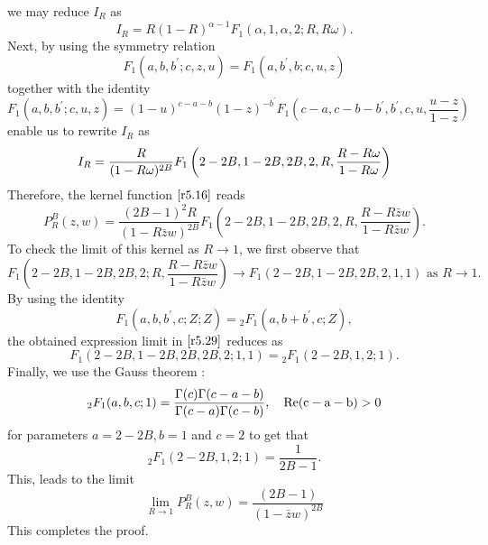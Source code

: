 we may reduce $I_{R}$ as 
\begin{equation}
\label{r5.24}
I_{R}=R(1-R)^{\alpha -1}F_{1}\left( \alpha ,1,\alpha ,2;R,R\omega \right) . 
\end{equation}
Next, by using the symmetry relation 
\begin{equation}
\label{r5.25}
F_{1}\left( a,b,b^{\prime };c,z,u\right) =F_{1}\left( a,b^{\prime
},b;c,u,z\right)  
\end{equation}
together with the identity \cite[p.449]{PBM}
\begin{equation}
\label{r5.26}
F_{1}\left( a,b,b^{\prime };c,u,z\right) =(1-u)^{c-a-b}(1-z)^{-b^{\prime
}}F_{1}\left( c-a,c-b-b^{\prime },b^{\prime },c,u,\frac{u-z}{1-z}\right) 
\end{equation}
enable us to rewrite $I_{R}$ as 
\begin{equation}
\label{r5.27}
I_{R}=\frac{R}{(1-R\omega )^{2B}}F_{1}\left( 2-2B,1-2B,2B,2,R,\frac{%
R-R\omega }{1-R\omega }\right)  
\end{equation}
Therefore, the kernel function $\eqref{r5.16} $ reads 
\begin{equation}
\label{r5.28}
P_{R}^{B}(z,w)=\frac{(2B-1)^{2}R}{(1-R\bar{z}w)^{2B}}F_{1}\left(
2-2B,1-2B,2B,2,R,\frac{R-R\bar{z}w}{1-R\bar{z}w}\right) . 
\end{equation}
To check the limit of this kernel as $R\rightarrow 1$, we first observe that 
\begin{equation}
\label{r5.29}
F_{1}\left( 2-2B,1-2B,2B,2;R,\frac{R-R\bar{z}w}{1-R\bar{z}w}\right)
\rightarrow F_{1}\left( 2-2B,1-2B,2B,2,1,1\right) \text{ as \ }R\rightarrow
1.  
\end{equation}
By using the identity \cite[p.452]{PBM} 
\begin{equation}
\label{r5.30}
F_{1}\left( a,b,b^{\prime },c;Z;Z\right) ={}_{2}F_{1}\left( a,b+b^{\prime
},c;Z\right) ,  
\end{equation}
the obtained expression limit in $\eqref{r5.29}$ reduces as 
\begin{equation}
\label{r5.31}
F_{1}\left( 2-2B,1-2B,2B,2B,2;1,1\right) ={}_{2}F_{1}\left(
2-2B,1,2;1\right) .  
\end{equation}
Finally, we use the Gauss theorem \cite[p.489]{PBM}: 
\begin{equation}
\label{r5.32}
{}_{2}F_{1}(a,b,c;1)=\frac{\Gamma (c)\Gamma (c-a-b)}{\Gamma (c-a)\Gamma (c-b)%
}, \quad \rm{Re}(c-a-b)>0  
\end{equation}
for parameters $a=2-2B,b=1$ and $c=2$ to get that 
\begin{equation}
\label{r5.33}
{}_{2}F_{1}\left( 2-2B,1,2;1\right) =\frac{1}{2B-1}.  
\end{equation}
This, leads to the limit 
\begin{equation}
\label{r5.34}
\lim_{R\rightarrow 1}P_{R}^{B}(z,w)=\frac{(2B-1)}{(1-\bar{z}w)^{2B}} 
\end{equation}
This completes the proof.

